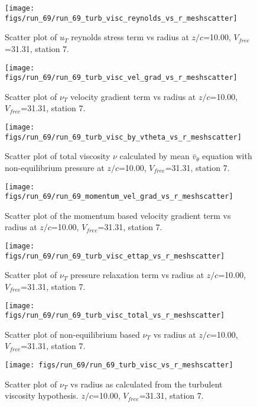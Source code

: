 \begin{figure}[H]
\centering
\texttt{[image: figs/run\_69/run\_69\_turb\_visc\_reynolds\_vs\_r\_meshscatter]}
\caption{Scatter plot of $
u_T$ reynolds stress term vs radius at $z/c$=10.00, $V_{free}$=31.31, station 7.}
\end{figure}


\begin{figure}[H]
\centering
\texttt{[image: figs/run\_69/run\_69\_turb\_visc\_vel\_grad\_vs\_r\_meshscatter]}
\caption{Scatter plot of $\nu_T$ velocity gradient term vs radius at $z/c$=10.00, $V_{free}$=31.31, station 7.}
\end{figure}


\begin{figure}[H]
\centering
\texttt{[image: figs/run\_69/run\_69\_turb\_visc\_by\_vtheta\_vs\_r\_meshscatter]}
\caption{Scatter plot of total viscosity $\nu$ calculated by mean $\bar{v}_{\theta}$ equation with non-equilibrium pressure at $z/c$=10.00, $V_{free}$=31.31, station 7.}
\end{figure}


\begin{figure}[H]
\centering
\texttt{[image: figs/run\_69/run\_69\_momentum\_vel\_grad\_vs\_r\_meshscatter]}
\caption{Scatter plot of the momentum based velocity gradient term vs radius at $z/c$=10.00, $V_{free}$=31.31, station 7.}
\end{figure}


\begin{figure}[H]
\centering
\texttt{[image: figs/run\_69/run\_69\_turb\_visc\_ettap\_vs\_r\_meshscatter]}
\caption{Scatter plot of $\nu_T$ pressure relaxation term vs radius at $z/c$=10.00, $V_{free}$=31.31, station 7.}
\end{figure}


\begin{figure}[H]
\centering
\texttt{[image: figs/run\_69/run\_69\_turb\_visc\_total\_vs\_r\_meshscatter]}
\caption{Scatter plot of non-equilibrium based $\nu_T$ vs radius at $z/c$=10.00, $V_{free}$=31.31, station 7.}
\end{figure}


\begin{figure}[H]
\centering
\texttt{[image: figs/run\_69/run\_69\_turb\_visc\_vs\_r\_meshscatter]}
\caption{Scatter plot of $\nu_T$ vs radius as calculated from the turbulent viscosity hypothesis. $z/c$=10.00, $V_{free}$=31.31, station 7.}
\end{figure}


